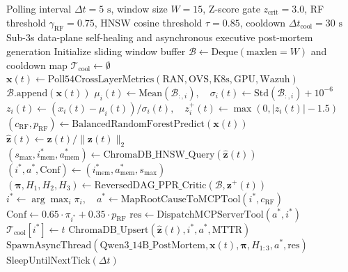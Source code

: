 \begin{algorithm}[!htb]
\caption{Closed-Loop Autonomous Telemetry Polling, Dual-Path RCA \& MCP Remediation}
\label{alg:closed_loop}
\begin{algorithmic}[1]
\Require Polling interval $\Delta t = 5\text{ s}$, window size $W = 15$, Z-score gate $z_{\text{crit}} = 3.0$, RF threshold $\gamma_{\text{RF}} = 0.75$, HNSW cosine threshold $\tau = 0.85$, cooldown $\Delta t_{\text{cool}} = 30\text{ s}$
\Ensure Sub-3s data-plane self-healing and asynchronous executive post-mortem generation
\State Initialize sliding window buffer $\mathcal{B} \leftarrow \text{Deque}(\text{maxlen}=W)$ and cooldown map $\mathcal{T}_{\text{cool}} \leftarrow \emptyset$
    \State $\mathbf{x}(t) \leftarrow \text{Poll54CrossLayerMetrics}(\text{RAN}, \text{OVS}, \text{K8s}, \text{GPU}, \text{Wazuh})$
    \State $\mathcal{B}.\text{append}(\mathbf{x}(t))$
        \State $\mu_i(t) \leftarrow \text{Mean}(\mathcal{B}_{:,i}), \quad \sigma_i(t) \leftarrow \text{Std}(\mathcal{B}_{:,i}) + 10^{-6}$
        \State $z_i(t) \leftarrow (x_i(t) - \mu_i(t)) / \sigma_i(t), \quad z_i^+(t) \leftarrow \max(0, |z_i(t)| - 1.5)$
    \EndFor
    \State $(c_{\text{RF}}, p_{\text{RF}}) \leftarrow \text{BalancedRandomForestPredict}(\mathbf{x}(t))$
        \State $\hat{\mathbf{z}}(t) \leftarrow \mathbf{z}(t) / \|\mathbf{z}(t)\|_2$
        \State $(s_{\max}, i_{\text{mem}}^*, a_{\text{mem}}^*) \leftarrow \text{ChromaDB\_HNSW\_Query}(\hat{\mathbf{z}}(t))$
         
            \State $(i^*, a^*, \text{Conf}) \leftarrow (i_{\text{mem}}^*, a_{\text{mem}}^*, s_{\max})$
        \Else {}
            \State $(\boldsymbol{\pi}, H_1, H_2, H_3) \leftarrow \text{ReversedDAG\_PPR\_Critic}(\mathcal{B}, \mathbf{z}^+(t))$ 
            \State $i^* \leftarrow \arg\max_i \pi_i, \quad a^* \leftarrow \text{MapRootCauseToMCPTool}(i^*, c_{\text{RF}})$
            \State $\text{Conf} \leftarrow 0.65 \cdot \pi_{i^*} + 0.35 \cdot p_{\text{RF}}$
        \EndIf
            \State $\text{res} \leftarrow \text{DispatchMCPServerTool}(a^*, i^*)$ 
            \State $\mathcal{T}_{\text{cool}}[i^*] \leftarrow t$
                \State $\text{ChromaDB\_Upsert}(\hat{\mathbf{z}}(t), i^*, a^*, \text{MTTR})$
                \State $\text{SpawnAsyncThread}(\text{Qwen3\_14B\_PostMortem}, \mathbf{x}(t), \boldsymbol{\pi}, H_{1:3}, a^*, \text{res})$
            \EndIf
        \EndIf
    \EndIf
    \State $\text{SleepUntilNextTick}(\Delta t)$
\EndWhile
\end{algorithmic}
\end{algorithm}

